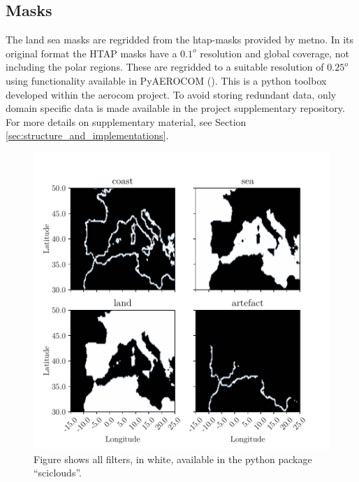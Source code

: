\subsection{Masks} \label{sec:mask}
The land sea masks are regridded from the \acrfull{htap}-masks provided by \acrfull{metno}. In its original format the HTAP masks have a $0.1^o$ resolution and global coverage, not including the polar regions. These are regridded to a suitable resolution of $0.25^o$ using functionality available in PyAEROCOM (\cite{pyaerocom}). %
This is a python toolbox developed within the \acrfull{aerocom} project. To avoid storing redundant data, only domain specific data is made available in the project supplementary repository. For more details on supplementary material, see Section \ref{sec:structure_and_implementations}.
\begin{figure}
    \centering
    \includegraphics{python_figs/filters.pdf}
    \caption{Figure shows all filters, in white, available in the python package ``sciclouds''.}
    \label{fig:filters_subplot}
\end{figure}

